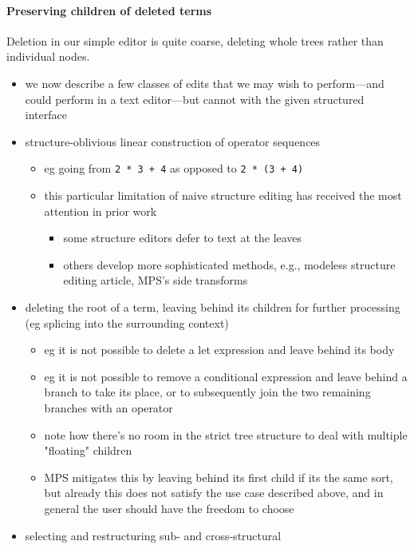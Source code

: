 \paragraph{Preserving children of deleted terms}
Deletion in our simple editor is quite coarse, deleting whole
trees rather than individual nodes.


\begin{itemize}
\item
  we now describe a few classes of edits that we may wish to perform---and
  could perform in a text editor---but cannot with the given structured
  interface
\item structure-oblivious linear construction of operator sequences
  \begin{itemize}
    \item eg going from \texttt{2 * 3 + 4} as opposed to \texttt{2 * (3 + 4)}
    \item this particular limitation of naive structure editing has received
      the most attention in prior work
    \begin{itemize}
      \item some structure editors defer to text at the leaves
      \item others develop more sophisticated methods, e.g.,
        modeless structure editing article,
        MPS's side transforms
    \end{itemize}
  \end{itemize}
\item deleting the root of a term,
  leaving behind its children for further processing
  (eg splicing into the surrounding context)
  \begin{itemize}
    \item eg it is not possible to delete a let expression and leave behind its body
    \item eg it is not possible to remove a conditional expression
      and leave behind a branch to take its place, or to subsequently join the
      two remaining branches with an operator
    \item note how there's no room in the strict tree structure to deal with
      multiple "floating" children
    \item MPS mitigates this by leaving behind its first child if its the
      same sort, but already this does not satisfy the use case described above,
      and in general the user should have the freedom to choose
  \end{itemize}
\item selecting and restructuring sub- and cross-structural

\end{itemize}
